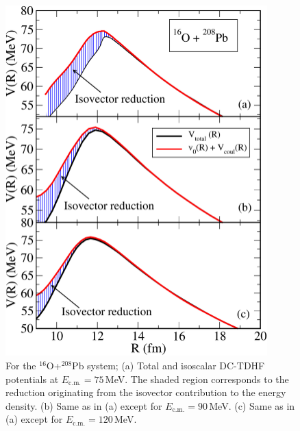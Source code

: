 \begin{figure}
	\centering
	\includegraphics*[width=0.9\textwidth]{../Figures/Isospin/V_16O_208Pb_ecm75.pdf}
	\caption{For the $^{16}$O+$^{208}$Pb system;
		(a) Total and isoscalar DC-TDHF potentials at $E_\mathrm{c.m.}=75$\,MeV. The shaded
		region corresponds to the reduction originating from the isovector contribution to
		the energy density.
		(b) Same as in (a) except for $E_\mathrm{c.m.}=90$\,MeV.
		(c) Same as in (a) except for $E_\mathrm{c.m.}=120$\,MeV.}
	\label{fig:OPb}
\end{figure}
